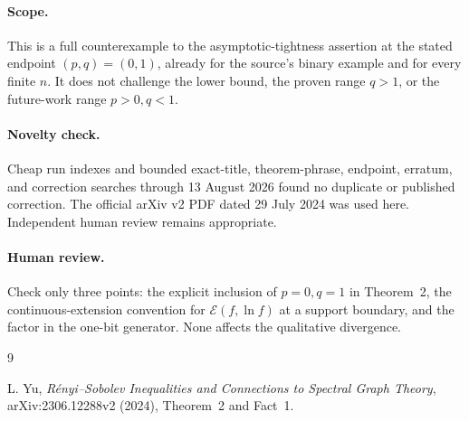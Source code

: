\documentclass[11pt]{article}
\newcommand{\E}{\mathcal E}
\begin{document}
\paragraph{Scope.}
This is a full counterexample to the asymptotic-tightness assertion at the
stated endpoint $(p,q)=(0,1)$, already for the source's binary example and
for every finite $n$.  It does not challenge the lower bound, the proven
range $q>1$, or the future-work range $p>0,q<1$.

\paragraph{Novelty check.}
Cheap run indexes and bounded exact-title, theorem-phrase, endpoint,
erratum, and correction searches through 13 August 2026 found no duplicate
or published correction.  The official arXiv v2 PDF dated 29 July 2024 was
used here.  Independent human review remains appropriate.

\paragraph{Human review.}
Check only three points: the explicit inclusion of $p=0,q=1$ in Theorem~2,
the continuous-extension convention for $\E(f,\ln f)$ at a support
boundary, and the factor in the one-bit generator.  None affects the
qualitative divergence.

\begin{thebibliography}{9}
\raggedright
{}
L. Yu,
\emph{R\'enyi--Sobolev Inequalities and Connections to Spectral Graph
Theory}, arXiv:2306.12288v2 (2024), Theorem~2 and Fact~1.
\end{thebibliography}
\end{document}

